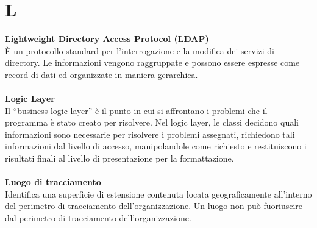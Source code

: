 \section{L}
\textbf{Lightweight Directory Access Protocol (LDAP)}\\
È un protocollo standard per l'interrogazione e la modifica dei servizi di directory. Le informazioni vengono raggruppate e possono essere espresse come record di dati ed organizzate in maniera gerarchica. \\ \\
\textbf{Logic Layer}\\
Il “business logic layer” è il punto in cui si affrontano i problemi che il programma è stato creato per risolvere. Nel logic layer, le classi decidono quali informazioni sono necessarie per risolvere i problemi assegnati, richiedono tali informazioni dal livello di accesso, manipolandole come richiesto e restituiscono i risultati finali al livello di presentazione per la formattazione. \\ \\
\textbf{Luogo di tracciamento}\\
Identifica una superficie di estensione contenuta locata geograficamente all'interno del perimetro di tracciamento dell'organizzazione. Un luogo non può fuoriuscire dal perimetro di tracciamento dell'organizzazione. \\ \\
\clearpage